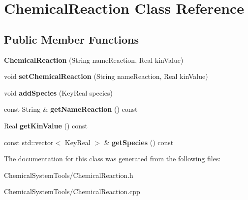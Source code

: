 \hypertarget{classChemicalReaction}{
\section{ChemicalReaction Class Reference}
\label{classChemicalReaction}
}
\subsection*{Public Member Functions}
\begin{DoxyCompactItemize}
\item 
\hypertarget{classChemicalReaction_a6af90fdc570a3b58f983b7cf9692e766}{
{\bfseries ChemicalReaction} (String nameReaction, Real kinValue)}
\label{classChemicalReaction_a6af90fdc570a3b58f983b7cf9692e766}

\item 
\hypertarget{classChemicalReaction_a31a0d6302796ce560d2983d7885f2c0d}{
void {\bfseries setChemicalReaction} (String nameReaction, Real kinValue)}
\label{classChemicalReaction_a31a0d6302796ce560d2983d7885f2c0d}

\item 
\hypertarget{classChemicalReaction_a6a8e09e4c96dc351fdb756ff4848e35f}{
void {\bfseries addSpecies} (KeyReal species)}
\label{classChemicalReaction_a6a8e09e4c96dc351fdb756ff4848e35f}

\item 
\hypertarget{classChemicalReaction_a2bc0c065a07adba9c2f97d69052d91ee}{
const String \& {\bfseries getNameReaction} () const }
\label{classChemicalReaction_a2bc0c065a07adba9c2f97d69052d91ee}

\item 
\hypertarget{classChemicalReaction_ac4b8b5ae5d9b806d7e37323876f3081c}{
Real {\bfseries getKinValue} () const }
\label{classChemicalReaction_ac4b8b5ae5d9b806d7e37323876f3081c}

\item 
\hypertarget{classChemicalReaction_ae00e74e62e03e4bb642b5bcce178ff5e}{
const std::vector$<$ KeyReal $>$ \& {\bfseries getSpecies} () const }
\label{classChemicalReaction_ae00e74e62e03e4bb642b5bcce178ff5e}

\end{DoxyCompactItemize}


The documentation for this class was generated from the following files:\begin{DoxyCompactItemize}
\item 
ChemicalSystemTools/ChemicalReaction.h\item 
ChemicalSystemTools/ChemicalReaction.cpp\end{DoxyCompactItemize}
